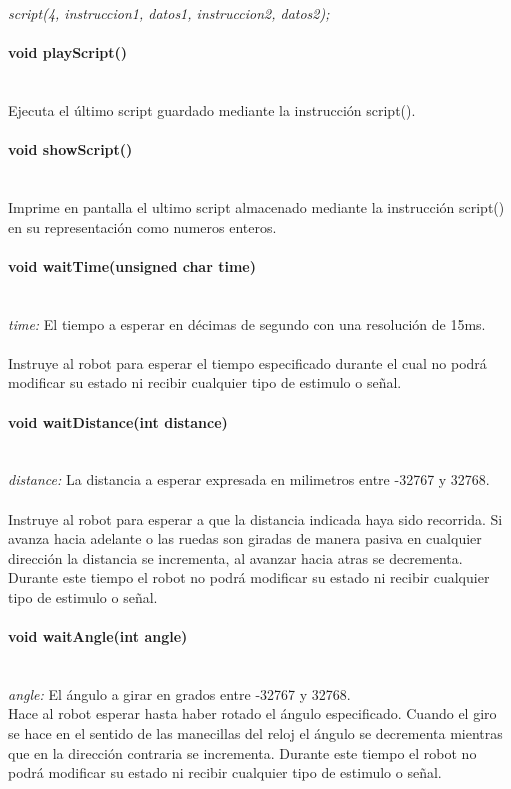 \documentclass[letterpaper,openright,12pt]{book}
\begin{document}
\emph{script(4, instruccion1, datos1, instruccion2, datos2);}

\paragraph{void playScript()}\mbox{}\\
Ejecuta el último script guardado mediante la instrucción script().\\

\paragraph{void showScript()}\mbox{}\\
Imprime en pantalla el ultimo script almacenado mediante la instrucción script() en su representación como numeros enteros.\\

\paragraph{void waitTime(unsigned char time)}\mbox{}\\
\emph{time: } El tiempo a esperar en décimas de segundo con una resolución de 15ms.\\\\
Instruye al robot para esperar el tiempo especificado durante el cual no podrá modificar su estado ni recibir cualquier tipo de estimulo o señal.\\

\paragraph{void waitDistance(int distance)}\mbox{}\\
\emph{distance: } La distancia a esperar expresada en milimetros entre -32767 y 32768.\\\\

Instruye al robot para esperar a que la distancia indicada haya sido recorrida. Si avanza hacia adelante o las ruedas son giradas de manera pasiva en cualquier dirección la distancia se incrementa, al avanzar hacia atras se decrementa. Durante este tiempo el robot no podrá  modificar su estado ni recibir cualquier tipo de estimulo o señal.\\

\paragraph{void waitAngle(int angle)}\mbox{}\\
\emph{angle: } El ángulo a girar en grados entre -32767 y 32768.\\
Hace al robot esperar hasta haber rotado el ángulo especificado. Cuando el giro se hace en el sentido de las manecillas del reloj el ángulo  se decrementa mientras que en la dirección contraria se incrementa. Durante este tiempo el robot no podrá  modificar su estado ni recibir cualquier tipo de estimulo o señal.\\
\end{document}
